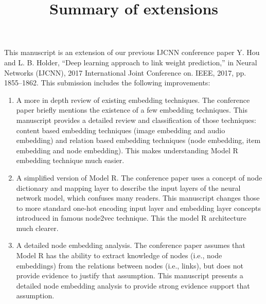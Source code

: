 \documentclass{article}
\begin{document}
\title{Summary of extensions}
\maketitle

This manuscript is an extension of our previous IJCNN conference paper
Y. Hou and L. B. Holder, “Deep learning approach to link weight
prediction,” in Neural Networks (IJCNN), 2017 International Joint
Conference on. IEEE, 2017, pp. 1855–1862.
This submission includes the following improvements:
\begin{enumerate}
	\item A more in depth review of existing embedding techniques.
	The conference paper briefly mentions the existence of a few embedding techniques.
	This manuscript provides a detailed review and classification of those techniques: content based embedding techniques (image embedding and audio embedding) and relation based embedding techniques (node embedding, item embedding and node embedding).
	This makes understanding Model R embedding technique much easier.
	\item A simplified version of Model R.
	The conference paper uses a concept of node dictionary and mapping layer to describe the input layers of the neural network model, which confuses many readers.
	This manuscript changes those to more standard one-hot encoding input layer and embedding layer concepts introduced in famous node2vec technique.
	This the model R architecture much clearer.
	\item A detailed node embedding analysis.
	The conference paper assumes that Model R has the ability to extract knowledge of nodes (i.e., node embeddings) from the relations between nodes (i.e., links), but does not provide evidence to justify that assumption.
	This manuscript presents a detailed node embedding analysis to provide strong evidence support that assumption.
\end{enumerate}
\end{document}
